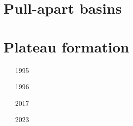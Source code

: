 \section{Pull-apart basins}

\begin{small}
\begin{itemize}
\item[\nineteenninetyfive] 
\item[\nineteenninetyeight] 
\item[\twothousandsix] 
\item[\twothousandeight] 
\item[\twothousandten] 
\item[\twothousandsixteen] 
\item[\twothousandtwentythree] 
\end{itemize}
\end{small}


\section{Plateau formation}


\begin{small}
\begin{itemize}
\item[1995] 
\item[1996] 
\item[2017] 
\item[2023] 
\end{itemize}
\end{small}



